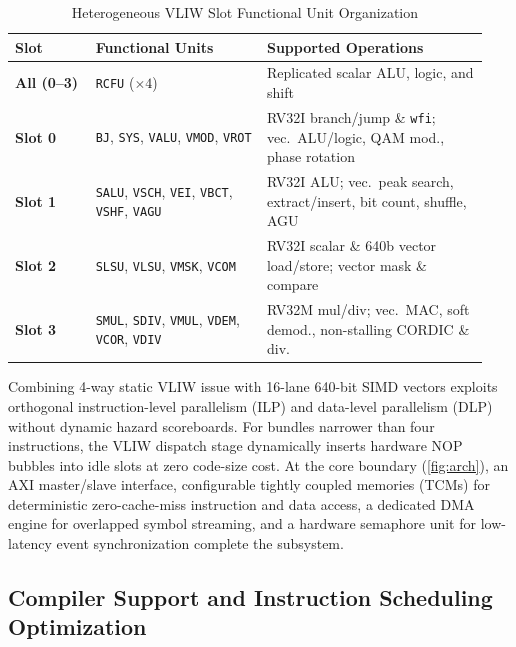 \documentclass[9pt,conference]{IEEEtran}
\begin{document}
\begin{table}[t]
\centering
\caption{Heterogeneous VLIW Slot Functional Unit Organization}
\label{tab:fu}
\renewcommand{\arraystretch}{1.14}
\setlength{\tabcolsep}{3.2pt}
\scriptsize
\begin{tabular}{@{}>{\raggedright\arraybackslash}p{0.16\linewidth}>{\raggedright\arraybackslash}p{0.34\linewidth}>{\raggedright\arraybackslash}p{0.44\linewidth}@{}}
\toprule
\textbf{Slot} & \textbf{Functional Units} & \textbf{Supported Operations} \\
\midrule
\textbf{All (0--3)} & \texttt{RCFU} ($\times 4$) & Replicated scalar ALU, logic, and shift \\
\cmidrule{1-3}
\textbf{Slot 0} & \texttt{BJ}, \texttt{SYS}, \texttt{VALU}, \texttt{VMOD}, \texttt{VROT} & RV32I branch/jump \& \texttt{wfi}; vec.\ ALU/logic, QAM mod., phase rotation \\
\cmidrule{1-3}
\textbf{Slot 1} & \texttt{SALU}, \texttt{VSCH}, \texttt{VEI}, \texttt{VBCT}, \texttt{VSHF}, \texttt{VAGU} & RV32I ALU; vec.\ peak search, extract/insert, bit count, shuffle, AGU \\
\cmidrule{1-3}
\textbf{Slot 2} & \texttt{SLSU}, \texttt{VLSU}, \texttt{VMSK}, \texttt{VCOM} & RV32I scalar \& 640b vector load/store; vector mask \& compare \\
\cmidrule{1-3}
\textbf{Slot 3} & \texttt{SMUL}, \texttt{SDIV}, \texttt{VMUL}, \texttt{VDEM}, \texttt{VCOR}, \texttt{VDIV} & RV32M mul/div; vec.\ MAC, soft demod., non-stalling CORDIC \& div. \\
\bottomrule
\end{tabular}
\end{table}

Combining 4-way static VLIW issue with 16-lane 640-bit SIMD vectors exploits orthogonal instruction-level parallelism (ILP) and data-level parallelism (DLP) without dynamic hazard scoreboards. For bundles narrower than four instructions, the VLIW dispatch stage dynamically inserts hardware NOP bubbles into idle slots at zero code-size cost. At the core boundary (\autoref{fig:arch}), an AXI master/slave interface, configurable tightly coupled memories (TCMs) for deterministic zero-cache-miss instruction and data access, a dedicated DMA engine for overlapped symbol streaming, and a hardware semaphore unit for low-latency event synchronization complete the subsystem.

\subsection{Compiler Support and Instruction Scheduling Optimization}
\label{subsec:compiler}
\end{document}
